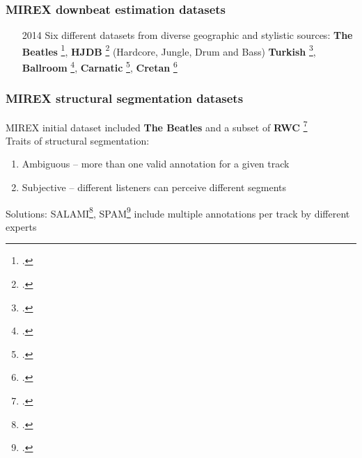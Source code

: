 \documentclass{beamer}
\begin{document}

\begin{frame}
	\frametitle{MIREX downbeat estimation datasets}
	\begin{enumerate}
		\item[2014]
			Six different datasets from diverse geographic and stylistic sources:
			\textbf{The Beatles} \footcite{beatles}, \textbf{HJDB} \footcite{hjdb} (Hardcore, Jungle, Drum and Bass)
			\textbf{Turkish} \footcite{turkish}, \textbf{Ballroom} \footcite{ballroom},
			\textbf{Carnatic} \footcite{carnatic}, \textbf{Cretan} \footcite{cretan}
	\end{enumerate}
\end{frame}


\begin{frame}
	\frametitle{MIREX structural segmentation datasets}
	MIREX initial dataset included \textbf{The Beatles} and a subset of \textbf{RWC} \footcite{rwc}\\
	Traits of structural segmentation:
	\begin{enumerate}
		\item
			Ambiguous -- more than one valid annotation for a given track
		\item
			Subjective -- different listeners can perceive different segments
	\end{enumerate}
	Solutions: SALAMI\footcite{salami}, SPAM\footcite{spam} include multiple annotations per track by different experts
\end{frame}
\end{document}

